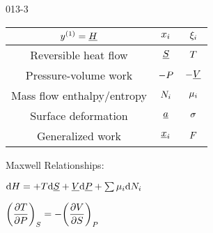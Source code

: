 \begin{mitframe}{013-3} %

    

\begin{longtable}{ | c | c | c | } 
 \hline
 	$ y^{(1)}= \uline{\enthalpy}$& $\conjcoor$ & $\conjcoortwo_{\state}$ \\ \hline
	Reversible heat flow & $\uline{\entropy}$ & $\Temp$ \\ \hline 
	Pressure-volume work & $-\p$ & $-\uline{\vol}$  \\ \hline
 	Mass flow enthalpy/entropy& $\nummoles_{\state}$ & $\chempot_{\state}$ \\ \hline   
	Surface deformation & $\totalsa$ & $\surftens$ \\ \hline   
    Generalized work & $\gendisp_{\state}$ & $\force$ \\ \hline
 
 
\end{longtable}

    
    
\begin{listone}
        
    \item Maxwell Relationships:
        
    \item $\mathrm{d}\enthalpy = +\Temp\mathrm{d}\uline{\entropy} + \uline{\vol}\mathrm{d}\uline{\p} + \sum\nolimits\chempot_{\state}\mathrm{d}\nummoles_{\state}$
         
    \item $\bigg(\dfrac{\partial\Temp}{\partial\p}\bigg)_{\entropy} = -\bigg(\dfrac{\partial\vol}{\partial\entropy}\bigg)_{\p}$
    
\end{listone}			

\end{mitframe}